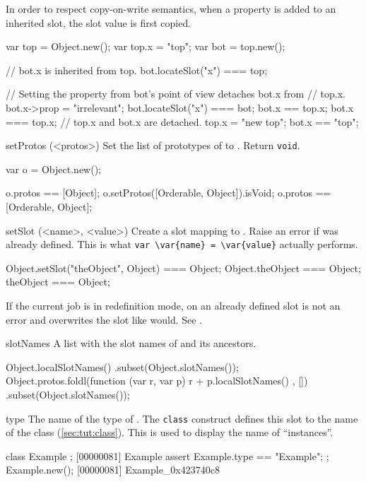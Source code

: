 \begin{urbiscriptapi}
  In order to respect copy-on-write semantics, when a property is added to
  an inherited slot, the slot value is first copied.

\begin{urbiassert}
var top = Object.new();
var top.x = "top";
var bot = top.new();

// bot.x is inherited from top.
bot.locateSlot("x") === top;

// Setting the property from bot's point of view detaches bot.x from
// top.x.
bot.x->prop = "irrelevant";
bot.locateSlot("x") === bot;
bot.x  == top.x;
bot.x === top.x;
// top.x and bot.x are detached.
top.x  = "new top";
bot.x == "top";
\end{urbiassert}


\item[setProtos](<protos>)%
  Set the list of prototypes of \this to .  Return
  \lstinline|void|.
\begin{urbiassert}
var o = Object.new();

o.protos == [Object];
o.setProtos([Orderable, Object]).isVoid;
o.protos == [Orderable, Object];
\end{urbiassert}


\item[setSlot](<name>, <value>)%
  Create a slot  mapping to . Raise an error if
   was already defined.  This is what
  \lstinline|var \var{name} = \var{value}| actually performs.
\begin{urbiassert}
Object.setSlot("theObject", Object) === Object;
Object.theObject === Object;
theObject === Object;
\end{urbiassert}

If the current job is in redefinition mode,  on an already
defined slot is not an error and overwrites the slot like
 would. See .


\item[slotNames]%
  A list with the slot names of \this and its ancestors.
\begin{urbiassert}
Object.localSlotNames()
  .subset(Object.slotNames());
Object.protos.foldl(function (var r, var p) { r + p.localSlotNames() },
                    [])
  .subset(Object.slotNames());
\end{urbiassert}


\item[type]%
  The name of the type of \this.  The \lstinline|class|
  construct defines this slot to the name of the class
  (\autoref{sec:tut:class}).  This is used to display the name of
  ``instances''.
\begin{urbiscript}
class Example {};
[00000081] Example
assert
{
  Example.type == "Example";
};
Example.new();
[00000081] Example_0x423740c8
\end{urbiscript}



\end{urbiscriptapi}
